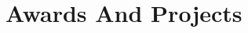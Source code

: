 \documentclass[a4paper]{deedy-resume} %
\begin{document}




\vfill

\noindent\makebox[\linewidth]{\color{headings}\rule{\paperwidth}{0.4pt}}


\section{Awards And Projects}
\end{document}
